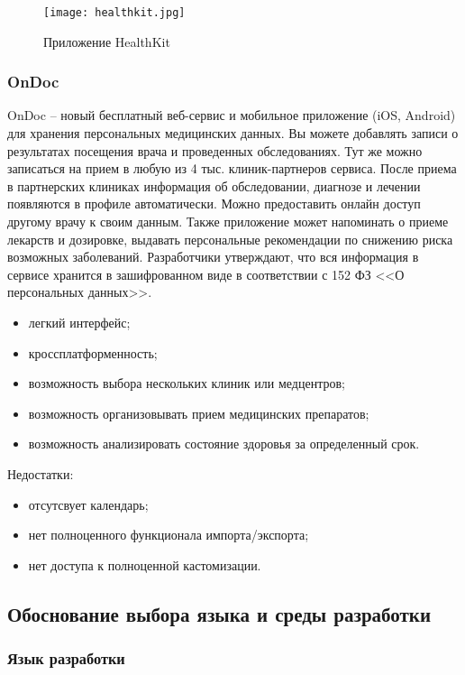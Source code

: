 \begin{figure}[ht]
\centering
  \texttt{[image: healthkit.jpg]}  
  \caption{ Приложение HealthKit }
  \label{fig:domain:manual_structure:credit_healthkit}
\end{figure}

\subsubsection{OnDoc}

OnDoc -- новый бесплатный веб-сервис и мобильное приложение (iOS, Android) для хранения персональных медицинских данных. Вы можете добавлять записи о результатах посещения врача и проведенных обследованиях. Тут же можно записаться на прием в любую из 4 тыс. клиник-партнеров сервиса. После приема в партнерских клиниках информация об обследовании, диагнозе и лечении появляются в профиле автоматически. Можно предоставить онлайн доступ другому врачу к своим данным. Также приложение может напоминать о приеме лекарств и дозировке, выдавать персональные рекомендации по снижению риска возможных заболеваний. Разработчики утверждают, что вся информация в сервисе хранится в зашифрованном виде в соответствии с 152 ФЗ <<О персональных данных>>.

\begin{itemize}
  \item легкий интерфейс;
  \item кроссплатформенность;
  \item возможность выбора нескольких клиник или медцентров;
  \item возможность организовывать прием медицинских препаратов;
  \item возможность анализировать состояние здоровья за определенный срок.
\end{itemize}
Недостатки:
\begin{itemize}
  \item отсутсвует календарь;
  \item нет полноценного функционала импорта/экспорта;
  \item нет доступа к полноценной кастомизации.
\end{itemize}


\subsection{Обоснование выбора языка и среды разработки} %
\label{sub:domain:existing_language}

\subsubsection{Язык разработки}

